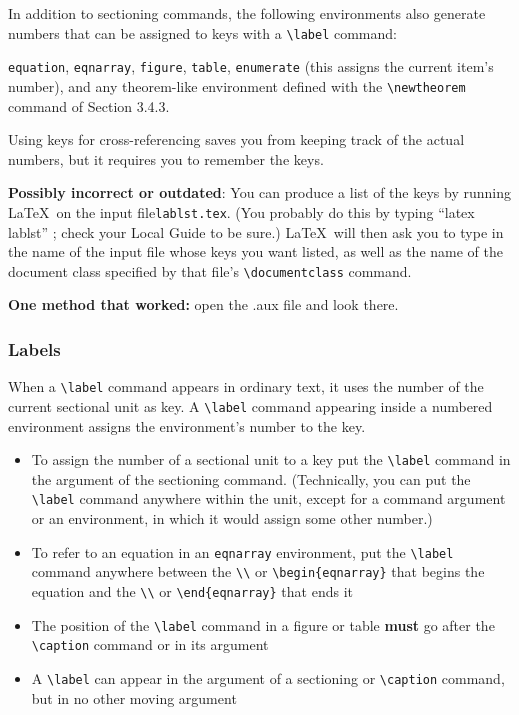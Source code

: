 \documentclass{article}
\newcommand{\justtext}[1]{\texttt{\textbackslash #1}}
\begin{document}
In addition to sectioning commands, the following environments also generate numbers that can be
assigned to keys with a \justtext{label} command: 

{\tt equation}, 
{\tt eqnarray},
{\tt figure}, 
{\tt table}, 
{\tt enumerate} (this assigns the current item's number), 
and any theorem-like environment defined with the \justtext{newtheorem} command of Section 3.4.3.

Using keys for cross-referencing saves you from keeping track of the actual numbers, but it requires
you to remember the keys. 

\textbf{Possibly incorrect or outdated}: You can produce a list of the keys by running \LaTeX\ on the
 input file{\tt lablst.tex}. (You probably do this by typing ``latex lablst'' ; check your Local
 Guide to be sure.) \LaTeX\ will then ask you to type in the name of the input file whose keys you
 want listed, as well as the name of the document class specified by that file's 
 \justtext{documentclass} command.
 
 \textbf{One method that worked:} open the .aux file and look there.
 
\subsubsection{Labels}

When a \justtext{label} command appears in ordinary text, it uses the number of the current
sectional unit as key. A \justtext{label} command appearing inside a numbered environment assigns
the environment's number to the key.

\begin{itemize}
   
   \item To assign the number of a sectional unit to a key put the \justtext{label} command in the
    argument of the sectioning command. (Technically, you can put the \justtext{label} command
    anywhere within the unit, except for a command argument or an environment, in which it would
    assign some other number.)

   \item To refer to an equation in an {\tt eqnarray} environment, put the \justtext{label} command 
    anywhere between the \justtext{\textbackslash} or \justtext{begin\{eqnarray\}} that begins the 
    equation and the \justtext{\textbackslash} or \justtext{end\{eqnarray\}} that ends it

   \item The position of the \justtext{label} command in a figure or table \textbf{must} go after
    the \justtext{caption} command or in its argument
    
   \item A \justtext{label} can appear in the argument of a sectioning or \justtext{caption} 
    command, but in no other moving argument

\end{itemize}
\end{document}
